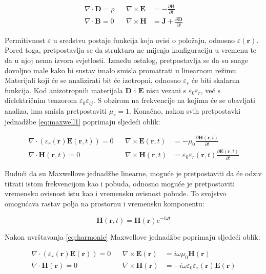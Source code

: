 \documentclass[utf8, seminar, numeric]{fer}
\begin{document}
\begin{align} \label{eq:maxwell1}
	\nabla \cdot \mathbf{D} = \rho &&
	\nabla \times \mathbf{E} &=
		- \frac{\partial \mathbf{B}}{\partial t}  \nonumber \\
	\nabla \cdot \mathbf{B} = 0 &&
	\nabla \times \mathbf{H} &=
		\mathbf{J} + \frac{\partial \mathbf{D}}{\partial t}
\end{align}

Permitivnost $\varepsilon$ u sredstvu postaje funkcija koja ovisi o položaju,
odnosno $\varepsilon(\mathbf{r})$. Pored toga, pretpostavlja se da struktura ne
mijenja konfiguraciju u vremenu te da u njoj nema izvora svjetlosti. Između
ostalog, pretpostavlja se da su snage dovoljno male kako bi sustav imalo smisla
promatrati u linearnom režimu. Materijali koji će se analizirati bit će
izotropni, odnosno $\varepsilon_r$ će biti skalarna funkcija. Kod
anizotropnih materijala $\mathbf{D}$ i $\mathbf{E}$ nisu vezani s
$\varepsilon_0 \varepsilon_r$, već s dielektričnim tenzorom
$\varepsilon_0 \varepsilon_{ij}$. S obzirom na frekvencije na kojima će se
obavljati analiza, ima smisla pretpostaviti $\mu_r = 1$. Konačno, nakon svih
pretpostavki jednadžbe \ref{eq:maxwell1} poprimaju sljedeći oblik:

\begin{align} \label{eq:maxwell2}
	\nabla \cdot (\varepsilon_r(\mathbf{r}) \mathbf{E}(\mathbf{r}, t)) = 0 &&
	\nabla \times \mathbf{E}(\mathbf{r}, t) &=
		- \mu_0
		\frac{\partial \mathbf{H}(\mathbf{r}, t)}{\partial t}  \nonumber \\
	\nabla \cdot \mathbf{H}(\mathbf{r}, t) = 0 &&
	\nabla \times \mathbf{H}(\mathbf{r}, t) &=
		\varepsilon_0 \varepsilon_r(\mathbf{r}, t)
		\frac{\partial \mathbf{E}(\mathbf{r}, t)}{\partial t}
\end{align}

Budući da su Maxwellove jednadžbe linearne\cite{time-harmonic_maxwell},
moguće je pretpostaviti da će odziv titrati istom frekvencijom kao i pobuda,
odnosno moguće je pretpostaviti vremensku ovisnost istu kao i vremensku ovisnost
pobude. To svojstvo omogućava rastav polja na prostornu i vremensku komponentu:

\begin{equation} \label{eq:harmonic}
	\mathbf{H}(\mathbf{r}, t) = \mathbf{H}(\mathbf{r}) e^{-i \omega t}
\end{equation}

Nakon uvrštavanja \ref{eq:harmonic} Maxwellove jednadžbe poprimaju sljedeći
oblik:

\begin{align} \label{eq:maxwell3}
	\nabla \cdot (\varepsilon_r(\mathbf{r}) \mathbf{E}(\mathbf{r})) = 0 &&
	\nabla \times \mathbf{E}(\mathbf{r}) &=
		i \omega \mu_0 \mathbf{H}(\mathbf{r})  \nonumber \\
	\nabla \cdot \mathbf{H}(\mathbf{r}) = 0 &&
	\nabla \times \mathbf{H}(\mathbf{r}) &=
		- i \omega \varepsilon_0 \varepsilon_r(\mathbf{r})\mathbf{E}(\mathbf{r})
\end{align}
\end{document}
